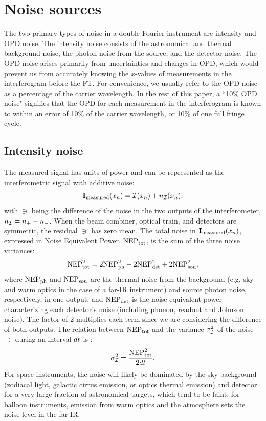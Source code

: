 \section{Noise sources}
The two primary types of noise in a double-Fourier instrument are intensity and OPD noise. The intensity
noise consists of the astronomical and thermal background noise, the photon noise from the source, and the detector noise. The OPD noise arises primarily from uncertainties and changes in OPD, which would prevent us from accurately knowing the $x$-values of measurements in the interferogram before the FT. For convenience, we usually refer to the OPD noise as a percentage of the carrier wavelength. In the rest of this paper, a ``10\% OPD noise" signifies that the OPD for each measurement in the interferogram is known to within an error of 10\% of the carrier wavelength, or 10\% of one full fringe cycle.

\subsection{Intensity noise}
\label{sec:noisesource}
The measured signal has units of power and can be represented as the interferometric signal with additive noise:
\begin{equation}
\textrm{\textbf{I}}_\textrm{measured}(x_n) = \mathcal{I}(x_n) + n_{\mathcal{I}}(x_n),
\label{eq:thermalnoise}
\end{equation}
with $\ni$ being the difference of the noise in the two outputs of the interferometer, $n_{\mathcal{I}} = n_+-n_-$. When the beam combiner, optical train, and detectors are symmetric, the residual $\ni$ has zero mean. 
The total noise in $\textrm{\textbf{I}}_\textrm{measured}(x_n)$, expressed in Noise Equivalent Power, $\textrm{NEP}_\textrm{tot}$, is the sum of the three noise variances: 
\begin{equation}
\textrm{NEP}_\textrm{tot}^2 = 2\textrm{NEP}_\textrm{ph}^2 +2\textrm{NEP}_\textrm{det}^2 +  2\textrm{NEP}_\textrm{sou}^2,
\end{equation}
where $\textrm{NEP}_\textrm{ph}$ and $\textrm{NEP}_\textrm{sou}$ are the thermal noise from the background (e.g. sky and warm optics in the case of a far-IR instrument)
and source photon noise, respectively, in one output, and $\textrm{NEP}_\textrm{det}$ is the noise-equivalent power characterizing each detector's noise (including phonon, readout and Johnson noise). The factor of 2 multiplies each term since we are considering the difference of both outputs.
The relation between $\textrm{NEP}_\textrm{tot}$ and the variance $\sigma_{\mathcal{I}}^2$ of the noise $\ni$ during an interval $dt$ is \citep{Sromovsky:2003in}:
\begin{equation}
\label{eq:sigI}
\sigma_{\mathcal{I}}^2 = \frac{\textrm{NEP}_\textrm{tot}^2}{2dt}.
\end{equation}
For space instruments, the noise will likely be dominated by the sky background (zodiacal light, galactic cirrus emission, or optics thermal emission) and detector for a very large fraction of astronomical targets, which tend to be faint; for balloon instruments, emission from
warm optics and the atmosphere sets the noise level in the far-IR.

